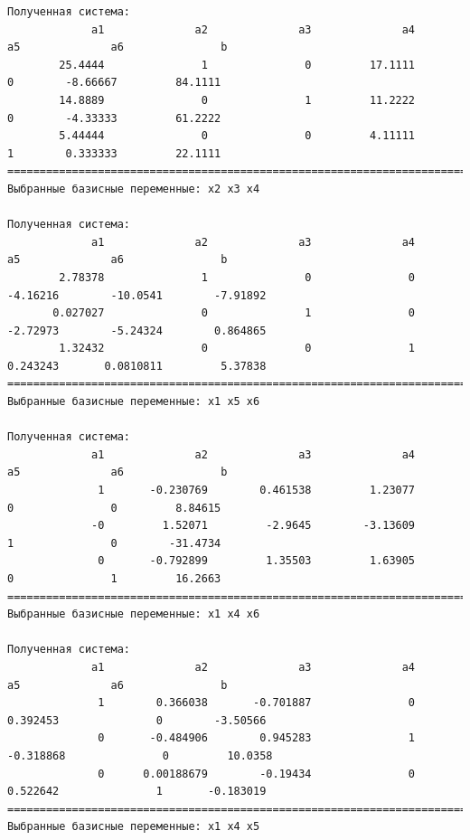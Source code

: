 \documentclass[a4paper,14pt]{extarticle}
\begin{document}
\begin{verbatim}
Полученная система:
             a1              a2              a3              a4              a5              a6               b
        25.4444               1               0         17.1111               0        -8.66667         84.1111
        14.8889               0               1         11.2222               0        -4.33333         61.2222
        5.44444               0               0         4.11111               1        0.333333         22.1111
==================================================================================================================
Выбранные базисные переменные: x2 x3 x4

Полученная система:
             a1              a2              a3              a4              a5              a6               b
        2.78378               1               0               0        -4.16216        -10.0541        -7.91892
       0.027027               0               1               0        -2.72973        -5.24324        0.864865
        1.32432               0               0               1        0.243243       0.0810811         5.37838
==================================================================================================================
Выбранные базисные переменные: x1 x5 x6

Полученная система:
             a1              a2              a3              a4              a5              a6               b
              1       -0.230769        0.461538         1.23077               0               0         8.84615
             -0         1.52071         -2.9645        -3.13609               1               0        -31.4734
              0       -0.792899         1.35503         1.63905               0               1         16.2663
==================================================================================================================
Выбранные базисные переменные: x1 x4 x6 

Полученная система:
             a1              a2              a3              a4              a5              a6               b
              1        0.366038       -0.701887               0        0.392453               0        -3.50566
              0       -0.484906        0.945283               1       -0.318868               0         10.0358
              0      0.00188679        -0.19434               0        0.522642               1       -0.183019
==================================================================================================================
Выбранные базисные переменные: x1 x4 x5


\end{verbatim}
\end{document}
